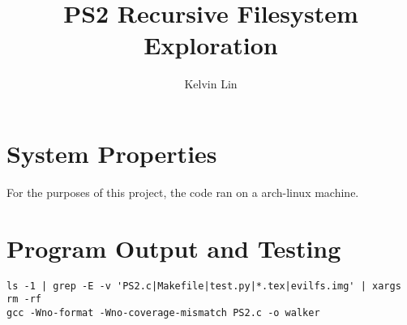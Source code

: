 \documentclass[12pt]{article}
\title{PS2 Recursive Filesystem Exploration}
\author{Kelvin Lin}
\begin{document}
\maketitle

\section{System Properties}
For the purposes of this project, the code ran on a arch-linux machine.

\section{Program Output and Testing}

\begin{lstlisting}
ls -1 | grep -E -v 'PS2.c|Makefile|test.py|*.tex|evilfs.img' | xargs rm -rf
gcc -Wno-format -Wno-coverage-mismatch PS2.c -o walker


\end{lstlisting}
\end{document}
